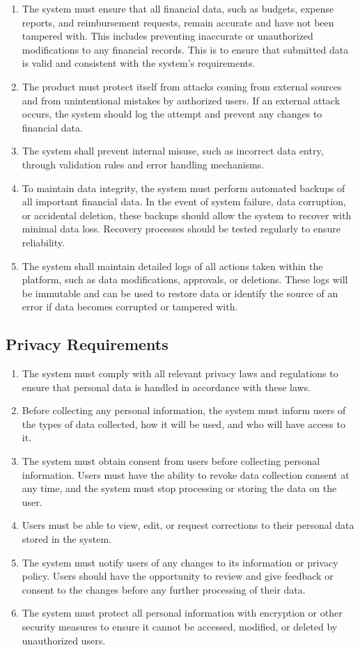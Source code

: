 \documentclass[12pt]{article}
\begin{document}
\begin{enumerate}
    \item The system must ensure that all financial data, such as budgets, expense reports, and reimbursement requests, remain accurate and have not been tampered with. This includes preventing inaccurate or unauthorized modifications to any financial records. This is to ensure that submitted data is valid and consistent with the system's requirements.
    \item The product must protect itself from attacks coming from external sources and from unintentional mistakes by authorized users. If an external attack occurs, the system should log the attempt and prevent any changes to financial data.
    \item The system shall prevent internal misuse, such as incorrect data entry, through validation rules and error handling mechanisms.
    \item To maintain data integrity, the system must perform automated backups of all important financial data. In the event of system failure, data corruption, or accidental deletion, these backups should allow the system to recover with minimal data loss. Recovery processes should be tested regularly to ensure reliability.
    \item The system shall maintain detailed logs of all actions taken within the platform, such as data modifications, approvals, or deletions. These logs will be immutable and can be used to restore data or identify the source of an error if data becomes corrupted or tampered with.
\end{enumerate}

\subsection{Privacy Requirements}

\begin{enumerate}
  \item The system must comply with all relevant privacy laws and regulations to ensure that personal data is handled in accordance with these laws.
  \item Before collecting any personal information, the system must inform users of the types of data collected, how it will be used, and who will have access to it.
  \item The system must obtain consent from users before collecting personal information. Users must have the ability to revoke data collection consent at any time, and the system must stop processing or storing the data on the user.
  \item Users must be able to view, edit, or request corrections to their personal data stored in the system.
  \item The system must notify users of any changes to its information or privacy policy. Users should have the opportunity to review and give feedback or consent to the changes before any further processing of their data.
  \item The system must protect all personal information with encryption or other security measures to ensure it cannot be accessed, modified, or deleted by unauthorized users. 
\end{enumerate}
\end{document}
